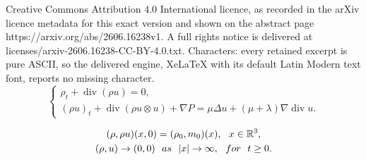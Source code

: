 \documentclass[10pt,a4paper]{amsart}
\DeclareMathOperator{\divv}{div}
\begin{document}
Creative Commons Attribution 4.0 International licence, as recorded in the arXiv licence metadata for this exact version and shown on the abstract page https://arxiv.org/abs/2606.16238v1. A full rights notice is delivered at licenses/arxiv-2606.16238-CC-BY-4.0.txt. Characters: every retained excerpt is pure ASCII, so the delivered engine, XeLaTeX with its default Latin Modern text font, reports no missing character.
\begin{equation}\label{1.2}
\begin{cases}
\rho_t + \divv(\rho u) = 0,\\
(\rho u)_t +  \divv(\rho u \otimes u)+\nabla P= \mu \Delta u + (\mu + \lambda) \nabla \divv u.
\end{cases}
\end{equation}

\begin{gather}\label{2.1}
(\rho,\rho u)(x,0)=(\rho_0,m_0)(x), \ \  x\in \mathbb{R}^3,
\\ \label{2.2}
(\rho,u)\to(0,0) \ \ {\rm as} \ \  |x|\to\infty,  \ \  {\rm for}\ \ t\geq 0.
\end{gather}
\end{document}
